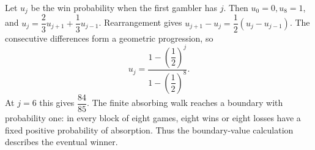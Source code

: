 Let $u_j$ be the win probability when the first gambler has $j$. Then $u_0=0,u_8=1$, and $u_j=\dfrac{2}{3}u_{j+1}+\dfrac{1}{3}u_{j-1}$. Rearrangement gives $u_{j+1}-u_j=\dfrac{1}{2}(u_j-u_{j-1})$. The consecutive differences form a geometric progression, so
\[u_j=\dfrac{1-(\dfrac{1}{2})^j}{1-(\dfrac{1}{2})^8}.\]
At $j=6$ this gives $\boxed{\dfrac{84}{85}}$. The finite absorbing walk reaches a boundary with probability one: in every block of eight games, eight wins or eight losses have a fixed positive probability of absorption. Thus the boundary-value calculation describes the eventual winner.
